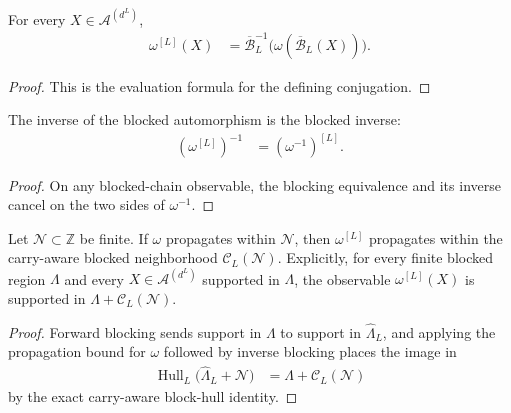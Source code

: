 \begin{lemma}
    \label{lem:qca_blocked_automorphism_apply}
    \leanok
    For every $X\in\mathcal A^{(d^L)}$,
    \begin{align}
        \omega^{[L]}(X)
         & =\overline{\mathcal B}_L^{-1}
        \bigl(\omega(\overline{\mathcal B}_L(X))\bigr).
    \end{align}
\end{lemma}

\begin{proof}\leanok
    This is the evaluation formula for the defining conjugation.
\end{proof}

\begin{lemma}
    \label{lem:qca_blocked_automorphism_symm}
    \leanok
    The inverse of the blocked automorphism is the blocked inverse:
    \begin{align}
        (\omega^{[L]})^{-1}
         & =(\omega^{-1})^{[L]}.
    \end{align}
\end{lemma}

\begin{proof}\leanok
    On any blocked-chain observable, the blocking equivalence
    and its inverse cancel on the two sides of $\omega^{-1}$.
\end{proof}

\begin{lemma}
    \label{lem:qca_propagates_within_blocked}
    \leanok
    Let $\mathcal N\subset\mathbb Z$ be finite.  If $\omega$ propagates within
    $\mathcal N$, then $\omega^{[L]}$ propagates within the carry-aware blocked
    neighborhood $\mathcal C_L(\mathcal N)$.  Explicitly, for every finite
    blocked region $\Lambda$ and every $X\in\mathcal A^{(d^L)}$ supported in
    $\Lambda$, the observable $\omega^{[L]}(X)$ is supported in
    $\Lambda+\mathcal C_L(\mathcal N)$.
\end{lemma}

\begin{proof}\leanok
    Forward blocking sends support in $\Lambda$ to support in
    $\widehat\Lambda_L$, and applying the propagation bound for $\omega$ followed by
    inverse blocking places the image in
    \begin{align}
        \operatorname{Hull}_L
        \bigl(\widehat\Lambda_L+\mathcal N\bigr)
         & =\Lambda+\mathcal C_L(\mathcal N)
    \end{align}
    by the exact carry-aware block-hull identity.
\end{proof}

